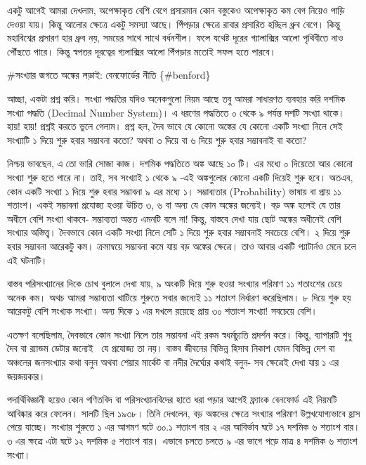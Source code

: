\documentclass[
]{book}
\begin{document}
একটু আগেই আমরা দেখলাম, অপেক্ষাকৃত বেশি বেগে প্রসারমান কোন বস্তুকেও অপেক্ষাকৃত কম বেগ নিয়েও পাড়ি দেওয়া যায়। কিন্তু আলোর ক্ষেত্রে একটু সমস্যা আছে। পিঁপড়ার ক্ষেত্রে রাবার প্রসারিত হচ্ছিল ধ্রুব বেগে। কিন্তু মহাবিশ্বের প্রসারণ হার ধ্রুব নয়, সময়ের সাথে সাথে বর্ধনশীল। ফলে যথেষ্ট দূরের গ্যালাক্সির আলো পৃথিবীতে নাও পৌঁছতে পারে। কিন্তু স্বপতর দূরত্বের গ্যলাক্সির আলো পিঁপড়ার মতোই সফল হতে পারবে।

\#সংখ্যার জগতে অঙ্কের লড়াই: বেনফোর্ডের নীতি \{\#benford\}

আচ্ছা, একটা প্রশ্ন করি। সংখ্যা পদ্ধতির যদিও অনেকগুলো নিয়ম আছে তবু আমরা সাধারণত ব্যবহার করি দশমিক সংখ্যা পদ্ধতি (Decimal Number System)। এ ধরণের পদ্ধতিতে ০ থেকে ৯ পর্যন্ত দশটি সংখ্যা থাকে। হায়! হায়! প্রশ্নই করতে ভুলে গেলাম। প্রশ্ন হল, দৈব ভাবে যে কোনো অঙ্কের যে কোনো একটি সংখ্যা নিলে সেই সংখ্যাটি ১ দিয়ে শুরু হবার সম্ভাবনা কতো? অথবা ৩ দিয়ে বা ৬ দিয়ে শুরু হবার সম্ভাবনাই বা কতো?

নিশ্চয় ভাবছেন, এ তো ভারি সোজা কাজ। দশমিক পদ্ধতিতে অঙ্ক আছে ১০ টি। এর মধ্যে ০ দিয়েতো আর কোনো সংখ্যা শুরু হতে পারে না। তাই, সব সংখ্যাই ১ থেকে ৯ -এই অঙ্কগুলোর কোনো একটি দিয়েই শুরু হবে। অতএব, কোন একটি সংখ্যা ১ দিয়ে শুরু হবার সম্ভাবনা ৯ এর মধ্যে ১। সম্ভাব্যতার (Probability) ভাষায় বা প্রায় ১১ শতাংশ। একই সম্ভাবনা প্রযোজ্য হওয়া উচিত ৩, ৬ বা অন্য যে কোন অঙ্কের জন্যেই। বড় অঙ্ক হলেই যে তার অধীনে বেশি সংখ্যা থাকবে- সম্ভাব্যতা অন্তত এমনটি বলে না!
কিন্তু, বাস্তবে দেখা যায় ছোট অঙ্কের অধীনেই বেশি সংখ্যার অস্তিত্ত্ব। দৈবভাবে কোন একটি সংখ্যা নিলে সেটি ১ দিয়ে শুরু হবার সম্ভাবনাই সবচেয়ে বেশি। ২ দিয়ে শুরু হবার সম্ভাবনা আরেকটু কম। ক্রমান্বয়ে সম্ভাবনা কমে যায় বড় অঙ্কের ক্ষেত্রে। তাও আবার একটি প্যাটার্নও মেনে চলে এই ঘটনাটি।~

বাস্তব পরিসংখ্যানের দিকে চোখ বুলালে দেখা যায়, ৯ অংকটি দিয়ে শুরু হওয়া সংখ্যার পরিমাণ ১১ শতাংশের চেয়ে অনেক কম। অথচ আমরা সম্ভাব্যতা খাটিয়ে শুরুতে সবার জন্যেই ১১ শতাংশ নির্ধারণ করেছিলাম। ৮ দিয়ে শুরু হয় আরেকটু বেশি সংখ্যক সংখ্যা। অন্য দিকে ১ এর দখলে রয়েছে প্রায় ৩০ শতাংশ সংখ্যা! সবচেয়ে বেশি।

এতক্ষণ বলেছিলাম, দৈবভাবে কোন সংখ্যা নিলে তার সম্ভাবনা এই রকম স্বধর্মচ্যুতি প্রদর্শন করে। কিন্তু, ব্যাপারটি শুধু দৈব বা র‍্যান্ডম ডেটার জন্যেই~ যে প্রযোজ্য তা নয়। বাস্তব জীবনের বিভিন্ন হিসাব নিকাশ যেমন বিভিন্ন দেশ বা অঞ্চলের জনসংখ্যার কথা বলুন অথবা শেয়ার মার্কেট বা নদীর দৈর্ঘ্যের কথাই বলুন- সব ক্ষেত্রেই দেখা যায় ১ এর জয়জয়কার।~

পদার্থিবিজ্ঞানী হয়েও কোন গণিতবিদ বা পরিসংখ্যানবিদের হাতে ধরা পড়ার আগেই ফ্র্যাংক বেনফোর্ড এই নিয়মটি আবিষ্কার করে ফেলেন। সালটি ছিল ১৯৩৮। তিনি দেখলেন, বড় অঙ্কদের ক্ষেত্রে সংখ্যার পরিমাণ উল্লখযোগ্যভাবে হ্রাস পেয়ে যাচ্ছে। সংখ্যার শুরুতে ১ এর আগমণ ঘটে ৩০.১ শতাংশ বার ২ এর আবির্ভাব ঘটে ১৭ দশমিক ৬ শতাংশ বার। ৩ এর ক্ষত্রে এটা ঘটে ১২ দশমিক ৫ শতাংশ বার। এভাবে চলতে চলতে ৯ এর ভাগে পড়ে মাত্র ৪ দশমিক ৬ শতাংশ সংখ্যা।~
\end{document}

